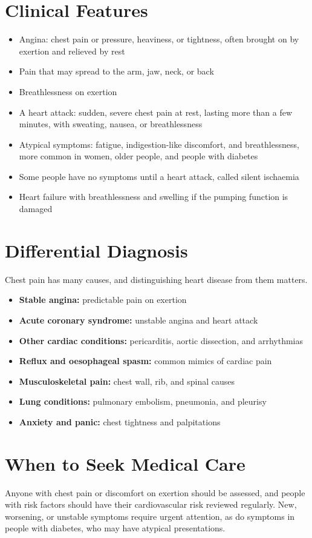 \section*{Clinical Features}
\begin{itemize}
    \item Angina: chest pain or pressure, heaviness, or tightness, often brought on by exertion and relieved by rest
    \item Pain that may spread to the arm, jaw, neck, or back
    \item Breathlessness on exertion
    \item A heart attack: sudden, severe chest pain at rest, lasting more than a few minutes, with sweating, nausea, or breathlessness
    \item Atypical symptoms: fatigue, indigestion-like discomfort, and breathlessness, more common in women, older people, and people with diabetes
    \item Some people have no symptoms until a heart attack, called silent ischaemia
    \item Heart failure with breathlessness and swelling if the pumping function is damaged
\end{itemize}

\section*{Differential Diagnosis}
Chest pain has many causes, and distinguishing heart disease from them matters.
\begin{itemize}
    \item \textbf{Stable angina:} predictable pain on exertion
    \item \textbf{Acute coronary syndrome:} unstable angina and heart attack
    \item \textbf{Other cardiac conditions:} pericarditis, aortic dissection, and arrhythmias
    \item \textbf{Reflux and oesophageal spasm:} common mimics of cardiac pain
    \item \textbf{Musculoskeletal pain:} chest wall, rib, and spinal causes
    \item \textbf{Lung conditions:} pulmonary embolism, pneumonia, and pleurisy
    \item \textbf{Anxiety and panic:} chest tightness and palpitations
\end{itemize}

\section*{When to Seek Medical Care}
Anyone with chest pain or discomfort on exertion should be assessed, and people with risk factors should have their cardiovascular risk reviewed regularly. New, worsening, or unstable symptoms require urgent attention, as do symptoms in people with diabetes, who may have atypical presentations.

